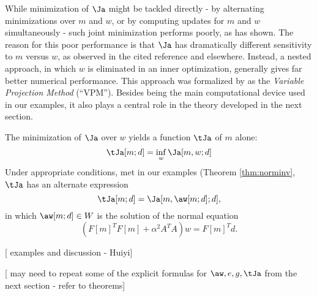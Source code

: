 While minimization of $\Ja$ might be tackled directly - by
alternating minimizations over $m$ and $w$, or by computing updates
for $m$ and $w$ simultaneously - such joint minimization performs
poorly, as \cite{YinHuang:16} has shown. The reason for this poor
performance is that $\Ja$ has dramatically different
sensitivity to $m$ versus $w$, as observed in the cited reference and elsewhere.
Instead, a nested approach, in which $w$ is
eliminated in an inner optimization,
generally gives far better numerical performance. This approach was
formalized by \cite{GolubPereyra:73,GolubPereyra:03} as the {\em
  Variable Projection Method} (``VPM''). Besides being the main
computational device used in our examples, it also plays a central
role in the theory developed in the next section.

The minimization of $\Ja$ over $w$ yields a function $\tJa$ of $m$
alone:
\begin{equation}
  \label{eqn:redexp0}
  \tJa[m;d] = \inf_w \Ja[m,w;d]
\end{equation}
Under appropriate conditions, met in our examples (Theorem
\ref{thm:norminv}, $\tJa$ has an alternate expression
\begin{equation}
  \label{eqn:redexp10}
  \tJa[m;d] = \Ja[m,\aw[m;d];d],
\end{equation}
in which $\aw[m;d] \in W$ is the solution of the normal
equation
\begin{equation}
  \label{eqn:norm0}
  (F[m]^TF[m]+\alpha^2A^TA)w= F[m]^Td.
\end{equation}

[ examples and discussion - Huiyi]

[ may need to repeat some of the explicit formulas for $\aw, e, g,
\tJa$ from the next section - refer to theorems]





